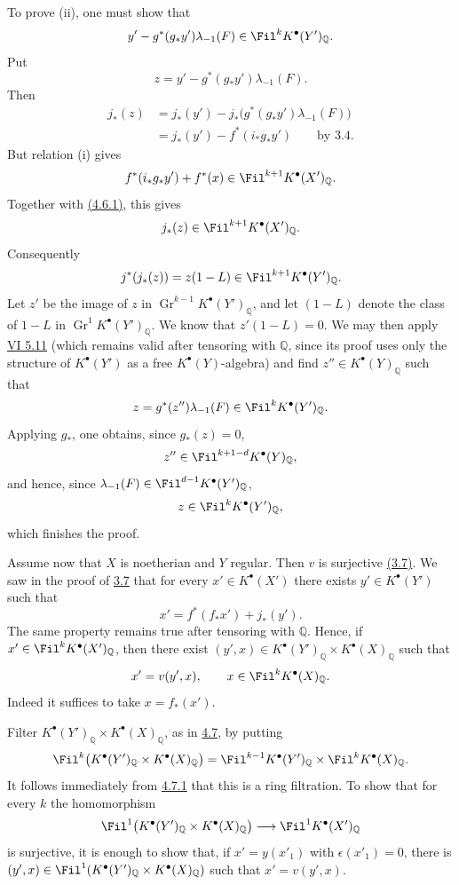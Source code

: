 To prove (ii), one must show that
\[
  y'-g^*(g_*y')\lambda_{-1}(F)\in\Fil^kK^\bullet(Y')_{\mathbb Q}.
\]
Put
\[
  z=y'-g^*(g_*y')\lambda_{-1}(F).
\]
Then
\[
\begin{aligned}
j_*(z)
  &=j_*(y')-j_*\bigl(g^*(g_*y')\lambda_{-1}(F)\bigr)\\
  &=j_*(y')-f^*(i_*g_*y')\qquad\text{by 3.4.}
\end{aligned}
\]
But relation (i) gives
\[
  f^*(i_*g_*y')+f^*(x)\in\Fil^{k+1}K^\bullet(X')_{\mathbb Q}.
\]
Together with \hyperlink{sga6.e07.eq.4-6-1}{(4.6.1)}, this gives
\[
  j_*(z)\in\Fil^{k+1}K^\bullet(X')_{\mathbb Q}.
\]
Consequently
\[
  j^*(j_*(z))=z(1-L)\in\Fil^{k+1}K^\bullet(Y')_{\mathbb Q}.
\]
Let \(z'\) be the image of \(z\) in
\(\operatorname{Gr}^{k-1}K^\bullet(Y')_{\mathbb Q}\), and let \((1-L)\) denote the class of \(1-L\) in \(\operatorname{Gr}^{1}K^\bullet(Y')_{\mathbb Q}\). We know that \(z'(1-L)=0\). We may then apply \hyperlink{sga6.e06.prop.5-11}{VI 5.11} (which remains valid after tensoring with \(\mathbb Q\), since its proof uses only the structure of \(K^\bullet(Y')\) as a free \(K^\bullet(Y)\)-algebra) and find \(z''\in K^\bullet(Y)_{\mathbb Q}\) such that
\[
  z=g^*(z'')\lambda_{-1}(F)\in\Fil^kK^\bullet(Y')_{\mathbb Q}.
\]
Applying \(g_*\), one obtains, since \(g_*(z)=0\),
\[
  z''\in\Fil^{k+1-d}K^\bullet(Y)_{\mathbb Q},
\]
and hence, since \(\lambda_{-1}(F)\in\Fil^{d-1}K^\bullet(Y')_{\mathbb Q}\),
\[
  z\in\Fil^kK^\bullet(Y')_{\mathbb Q},
\]
which finishes the proof.

Assume now that \(X\) is noetherian and \(Y\) regular. Then \(v\) is surjective \hyperlink{sga6.e07.thm.3-7}{(3.7)}. We saw in the proof of \hyperlink{sga6.e07.thm.3-7}{3.7} that for every \(x'\in K^\bullet(X')\) there exists \(y'\in K^\bullet(Y')\) such that
\[
  x'=f^*(f_*x')+j_*(y').
\]
The same property remains true after tensoring with \(\mathbb Q\). Hence, if \(x'\in\Fil^kK^\bullet(X')_{\mathbb Q}\), then there exist \((y',x)\in K^\bullet(Y')_{\mathbb Q}\times K^\bullet(X)_{\mathbb Q}\) such that
\[
  x'=v(y',x),\qquad x\in\Fil^kK^\bullet(X)_{\mathbb Q}.
\]
Indeed it suffices to take \(x=f_*(x')\).

Filter \(K^\bullet(Y')_{\mathbb Q}\times K^\bullet(X)_{\mathbb Q}\), as in \hyperlink{sga6.e07.sec.4.7}{4.7}, by putting
\[
  \Fil^k\bigl(K^\bullet(Y')_{\mathbb Q}\times K^\bullet(X)_{\mathbb Q}\bigr)
  =
  \Fil^{k-1}K^\bullet(Y')_{\mathbb Q}\times \Fil^kK^\bullet(X)_{\mathbb Q}.
\]
It follows immediately from \hyperlink{sga6.e07.eq.4-7-1}{4.7.1} that this is a ring filtration. To show that for every \(k\) the homomorphism
\[
  \Fil^1\bigl(K^\bullet(Y')_{\mathbb Q}\times K^\bullet(X)_{\mathbb Q}\bigr)
  \longrightarrow
  \Fil^1K^\bullet(X')_{\mathbb Q}
\]
is surjective, it is enough to show that, if \(x'=y(x'_1)\) with \(\epsilon(x'_1)=0\), there is \((y',x)\in\Fil^1(K^\bullet(Y')_{\mathbb Q}\times K^\bullet(X)_{\mathbb Q})\) such that \(x'=v(y',x)\).

